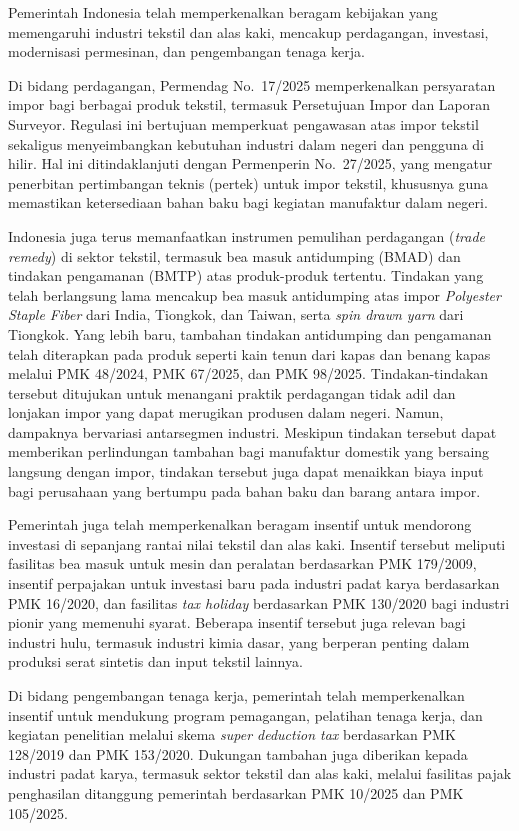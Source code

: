 \documentclass[
  manuscript=article,
  layout=publish,
  year=2026,
  volume=1,
]{den}
\begin{document}
Pemerintah Indonesia telah memperkenalkan beragam kebijakan yang
memengaruhi industri tekstil dan alas kaki, mencakup perdagangan,
investasi, modernisasi permesinan, dan pengembangan tenaga kerja.

Di bidang perdagangan, Permendag No.~17/2025 memperkenalkan persyaratan
impor bagi berbagai produk tekstil, termasuk Persetujuan Impor dan
Laporan Surveyor. Regulasi ini bertujuan memperkuat pengawasan atas
impor tekstil sekaligus menyeimbangkan kebutuhan industri dalam negeri
dan pengguna di hilir. Hal ini ditindaklanjuti dengan Permenperin
No.~27/2025, yang mengatur penerbitan pertimbangan teknis (pertek) untuk
impor tekstil, khususnya guna memastikan ketersediaan bahan baku bagi
kegiatan manufaktur dalam negeri.

Indonesia juga terus memanfaatkan instrumen pemulihan perdagangan
(\emph{trade remedy}) di sektor tekstil, termasuk bea masuk antidumping
(BMAD) dan tindakan pengamanan (BMTP) atas produk-produk tertentu.
Tindakan yang telah berlangsung lama mencakup bea masuk antidumping atas
impor \emph{Polyester Staple Fiber} dari India, Tiongkok, dan Taiwan,
serta \emph{spin drawn yarn} dari Tiongkok. Yang lebih baru, tambahan
tindakan antidumping dan pengamanan telah diterapkan pada produk seperti
kain tenun dari kapas dan benang kapas melalui PMK 48/2024, PMK 67/2025,
dan PMK 98/2025. Tindakan-tindakan tersebut ditujukan untuk menangani
praktik perdagangan tidak adil dan lonjakan impor yang dapat merugikan
produsen dalam negeri. Namun, dampaknya bervariasi antarsegmen industri.
Meskipun tindakan tersebut dapat memberikan perlindungan tambahan bagi
manufaktur domestik yang bersaing langsung dengan impor, tindakan
tersebut juga dapat menaikkan biaya input bagi perusahaan yang bertumpu
pada bahan baku dan barang antara impor.

Pemerintah juga telah memperkenalkan beragam insentif untuk mendorong
investasi di sepanjang rantai nilai tekstil dan alas kaki. Insentif
tersebut meliputi fasilitas bea masuk untuk mesin dan peralatan
berdasarkan PMK 179/2009, insentif perpajakan untuk investasi baru pada
industri padat karya berdasarkan PMK 16/2020, dan fasilitas \emph{tax
holiday} berdasarkan PMK 130/2020 bagi industri pionir yang memenuhi
syarat. Beberapa insentif tersebut juga relevan bagi industri hulu,
termasuk industri kimia dasar, yang berperan penting dalam produksi
serat sintetis dan input tekstil lainnya.

Di bidang pengembangan tenaga kerja, pemerintah telah memperkenalkan
insentif untuk mendukung program pemagangan, pelatihan tenaga kerja, dan
kegiatan penelitian melalui skema \emph{super deduction tax} berdasarkan
PMK 128/2019 dan PMK 153/2020. Dukungan tambahan juga diberikan kepada
industri padat karya, termasuk sektor tekstil dan alas kaki, melalui
fasilitas pajak penghasilan ditanggung pemerintah berdasarkan PMK
10/2025 dan PMK 105/2025.
\end{document}
